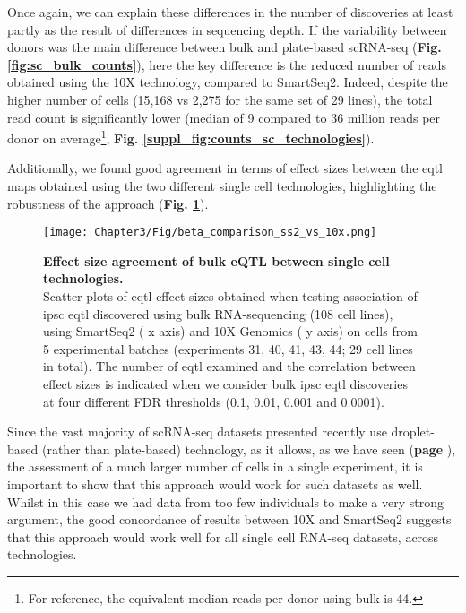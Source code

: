 Once again, we can explain these differences in the number of discoveries at least partly as the result of differences in sequencing depth.
If the variability between donors was the main difference between bulk and plate-based scRNA-seq (\textbf{Fig. \ref{fig:sc_bulk_counts}}), here the key difference is the reduced number of reads obtained using the 10X technology, compared to SmartSeq2.
Indeed, despite the higher number of cells (15,168 vs 2,275 for the same set of 29 lines), the total read count is significantly lower (median of 9 compared to 36 million reads per donor on average\footnote{For reference, the equivalent median reads per donor using bulk is 44.}, \textbf{Fig. \ref{suppl_fig:counts_sc_technologies}}).

\newpage

Additionally, we found good agreement in terms of effect sizes between the \gls{eqtl} maps obtained using the two different single cell technologies, highlighting the robustness of the approach (\textbf{Fig. \ref{fig:sc_eqtl_technologies}}). \\

\begin{figure}[h]
\centering
\texttt{[image: Chapter3/Fig/beta\_comparison\_ss2\_vs\_10x.png]}
\caption[iPSC sc-eQTL replication across technologies]{\textbf{Effect size agreement of bulk eQTL between single cell technologies.}\\
Scatter plots of \gls{eqtl} effect sizes obtained when testing association of \gls{ipsc} \gls{eqtl} discovered using bulk RNA-sequencing (108 cell lines), using SmartSeq2 (\cite{picelli2013smart} x axis) and 10X Genomics (\cite{zheng2017massively} y axis) on cells from 5 experimental batches (experiments 31, 40, 41, 43, 44; 29 cell lines in total). 
The number of \gls{eqtl} examined and the correlation between effect sizes is indicated when we consider bulk \gls{ipsc} \gls{eqtl} discoveries at four different FDR thresholds (0.1, 0.01, 0.001 and 0.0001).}
\label{fig:sc_eqtl_technologies}
\end{figure}

Since the vast majority of scRNA-seq datasets presented recently use droplet-based (rather than plate-based) technology, as it allows, as we have seen (\textbf{page \pageref{fig:scrnaseq_plate_vs_droplet}}), the assessment of a much larger number of cells in a single experiment, it is important to show that this approach would work for such datasets as well. 
Whilst in this case we had data from too few individuals to make a very strong argument, the good concordance of results between 10X and SmartSeq2 suggests that this approach would work well for all single cell RNA-seq datasets, across technologies.

